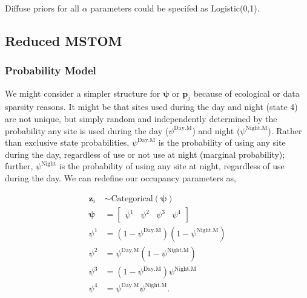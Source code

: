 \documentclass[12pt]{article}
\begin{document}
Diffuse priors for all $\alpha$ parameters could be specifed as Logistic(0,1).

\subsection{Reduced MSTOM}
\subsubsection{Probability Model}
We might consider a simpler structure for $\boldsymbol{\psi}$ or $\boldsymbol{p}_{j}$ because of ecological or data sparsity reasons. It might be that sites used during the day and night (state 4) are not unique, but simply random and independently determined by the probability any site is used during the day ($\psi^{\text{Day.M}}$) and night ($\psi^{\text{Night.M}}$). Rather than exclusive state probabilities, $\psi^{\text{Day.M}}$ is the probability of using any site during the day, regardless of use or not use at night (marginal probability); further, $\psi^{\text{Night}}$ is the probability of using any site at night, regardless of use during the day.  We can redefine our occupancy parameters as,
\begin{center}
\begin{align*}
\textbf{z}_{i} &\sim \text{Categorical}(\boldsymbol{\psi})\\
\boldsymbol{\psi} &= \begin{bmatrix} \psi^1 & \psi^2 & \psi^3 & \psi^4 \end{bmatrix}\\
\psi^1 &=(1-\psi^{\text{Day.M}})(1-\psi^{\text{Night.M}})\\
\psi^2 &=\psi^{\text{Day.M}}(1-\psi^{\text{Night.M}})\\
\psi^3 &=(1-\psi^{\text{Day.M}})\psi^{\text{Night.M}}\\
\psi^4 &=\psi^{\text{Day.M}}\psi^{\text{Night.M}}.\\
\end{align*}
\end{center}
\end{document}
